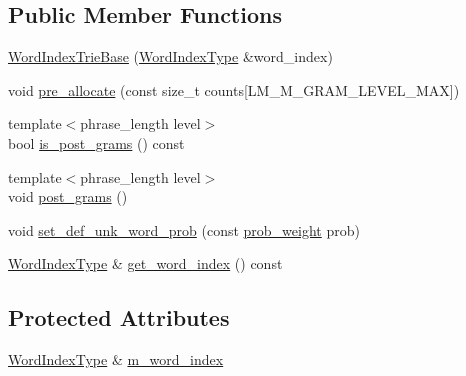\subsection*{Public Member Functions}
\begin{DoxyCompactItemize}
\item 
\hyperlink{classuva_1_1smt_1_1bpbd_1_1server_1_1lm_1_1_word_index_trie_base_a61b3b0e58d0e562930ff53a5892c31e3}{Word\+Index\+Trie\+Base} (\hyperlink{classuva_1_1smt_1_1bpbd_1_1server_1_1lm_1_1_word_index_trie_base_a77ee32bf3a9f8a89558bda4f2031200c}{Word\+Index\+Type} \&word\+\_\+index)
\item 
void \hyperlink{classuva_1_1smt_1_1bpbd_1_1server_1_1lm_1_1_word_index_trie_base_afb17729001cd31655d7079346b16695b}{pre\+\_\+allocate} (const size\+\_\+t counts\mbox{[}L\+M\+\_\+\+M\+\_\+\+G\+R\+A\+M\+\_\+\+L\+E\+V\+E\+L\+\_\+\+M\+A\+X\mbox{]})
\item 
{\footnotesize template$<$phrase\+\_\+length level$>$ }\\bool \hyperlink{classuva_1_1smt_1_1bpbd_1_1server_1_1lm_1_1_word_index_trie_base_a4857610639298d5bb2491fe5304bc80b}{is\+\_\+post\+\_\+grams} () const 
\item 
{\footnotesize template$<$phrase\+\_\+length level$>$ }\\void \hyperlink{classuva_1_1smt_1_1bpbd_1_1server_1_1lm_1_1_word_index_trie_base_acfb3fa5c23c2d2366deb9b55f4f094ab}{post\+\_\+grams} ()
\item 
void \hyperlink{classuva_1_1smt_1_1bpbd_1_1server_1_1lm_1_1_word_index_trie_base_a58a0e427c07cd89a236ed5ff39439c4f}{set\+\_\+def\+\_\+unk\+\_\+word\+\_\+prob} (const \hyperlink{namespaceuva_1_1smt_1_1bpbd_1_1server_a01e9ea4de9c226f4464862e84ff0bbcc}{prob\+\_\+weight} prob)
\item 
\hyperlink{classuva_1_1smt_1_1bpbd_1_1server_1_1lm_1_1_word_index_trie_base_a77ee32bf3a9f8a89558bda4f2031200c}{Word\+Index\+Type} \& \hyperlink{classuva_1_1smt_1_1bpbd_1_1server_1_1lm_1_1_word_index_trie_base_a9e4e3edf69a164308f569eb25c7806f9}{get\+\_\+word\+\_\+index} () const 
\end{DoxyCompactItemize}
\subsection*{Protected Attributes}
\begin{DoxyCompactItemize}
\item 
\hyperlink{classuva_1_1smt_1_1bpbd_1_1server_1_1lm_1_1_word_index_trie_base_a77ee32bf3a9f8a89558bda4f2031200c}{Word\+Index\+Type} \& \hyperlink{classuva_1_1smt_1_1bpbd_1_1server_1_1lm_1_1_word_index_trie_base_a57da26e5860ea31aa0f987e2ff478753}{m\+\_\+word\+\_\+index}
\end{DoxyCompactItemize}


